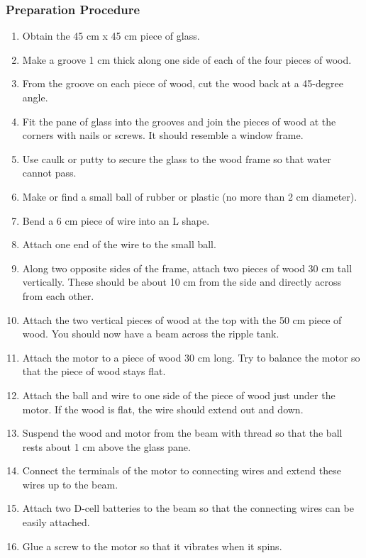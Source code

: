 \subsubsection*{Preparation Procedure}
\begin{enumerate}
\item{Obtain the 45 cm x 45 cm piece of glass.} 
\item{Make a groove 1 cm thick along one side of each of the four pieces of wood.} 
\item{From the groove on each piece of wood, cut the wood back at a 45-degree angle.} 
\item{Fit the pane of glass into the grooves and join the pieces of wood at the corners with nails or screws. It should resemble a window frame.} 
\item{Use caulk or putty to secure the glass to the wood frame so that water cannot pass.} 
\item{Make or find a small ball of rubber or plastic (no more than 2 cm diameter).} 
\item{Bend a 6 cm piece of wire into an L shape.} 
\item{Attach one end of the wire to the small ball.} 
\item{Along two opposite sides of the frame, attach two pieces of wood 30 cm tall vertically. These should be about 10 cm from the side and directly across from each other.} 
\item{Attach the two vertical pieces of wood at the top with the 50 cm piece of wood. You should now have a beam across the ripple tank.} 
\item{Attach the motor to a piece of wood 30 cm long. Try to balance the motor so that the piece of wood stays flat.} 
\item{Attach the ball and wire to one side of the piece of wood just under the motor. If the wood is flat, the wire should extend out and down.} 
\item{Suspend the wood and motor from the beam with thread so that the ball rests about 1 cm above the glass pane.} 
\item{Connect the terminals of the motor to connecting wires and extend these wires up to the beam.} 
\item{Attach two D-cell batteries to the beam so that the connecting wires can be easily attached.} 
\item{Glue a screw to the motor so that it vibrates when it spins.} 
\end{enumerate}

